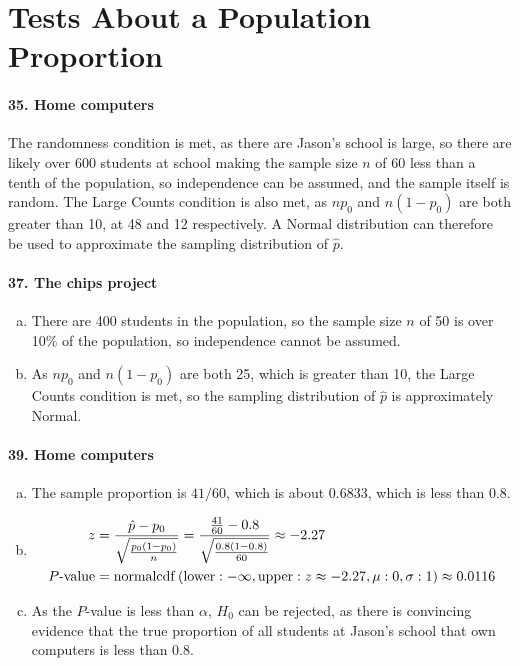 		\section{Tests About a Population Proportion}
			\paragraph{35. Home computers}
				The randomness condition is met, as there are Jason's school is large, so there are likely over 600 students at school making the sample size $n$ of 60 less than a tenth of the population, so independence can be assumed, and the sample itself is random.
				The Large Counts condition is also met, as $np_0$ and $n(1 - p_0)$ are both greater than 10, at 48 and 12 respectively. A Normal distribution can therefore be used to approximate the sampling distribution of $\hat{p}$.
			\paragraph{37. The chips project}
				\begin{enumerate}[a.]
					\item
						There are 400 students in the population, so the sample size $n$ of 50 is over 10\% of the population, so independence cannot be assumed.
					\item
						As $np_0$ and $n(1 - p_0)$ are both 25, which is greater than 10, the Large Counts condition is met, so the sampling distribution of $\hat{p}$ is approximately Normal.
				\end{enumerate}
			\paragraph{39. Home computers}
				\begin{enumerate}[a.]
					\item
						The sample proportion is $41/60$, which is about 0.6833, which is less than 0.8.
					\item
						\begin{align*}
							z &= \frac{\hat{p} - p_0}{\sqrt{\frac{p_0\left(1 - p_0\right)}{n}}} = \frac{\frac{41}{60} - 0.8}{\sqrt{\frac{0.8\left(1 - 0.8\right)}{60}}} \approx -2.27 \\
							P\text{-value} &= \operatorname{normalcdf}\left(\operatorname{lower}: -\infty, \operatorname{upper}: z \approx -2.27, \mu: 0, \sigma: 1\right) \approx 0.0116
						\end{align*}
					\item
						As the $P$-value is less than $\alpha$, $H_0$ can be rejected, as there is convincing evidence that the true proportion of all students at Jason's school that own computers is less than 0.8.
				\end{enumerate}
